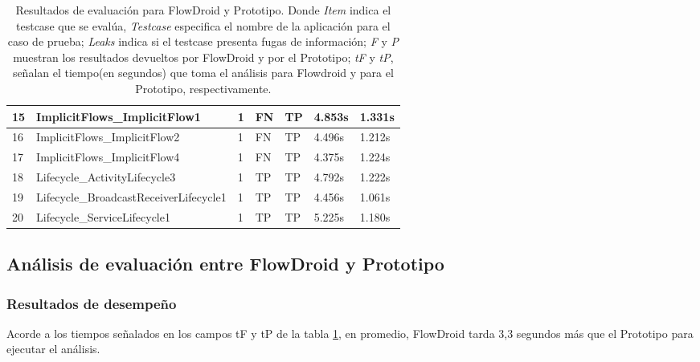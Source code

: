 \begin{table}[H]
\begin{center}
\begin{tabular}{|p{1cm}|p{6cm}|p{1cm}|p{1cm}|p{1cm}|p{1cm}|p{1cm}|}
	\hline
	15 & ImplicitFlows\_ImplicitFlow1 & 1 & FN & TP &4.853s &1.331s\\
	\hline
	16 & ImplicitFlows\_ImplicitFlow2 & 1 & FN & TP &4.496s &1.212s\\
	\hline
	17 & ImplicitFlows\_ImplicitFlow4 & 1 & FN & TP &4.375s &1.224s\\
	\hline
	18 & Lifecycle\_ActivityLifecycle3 & 1 & TP & TP &4.792s &1.222s\\
	\hline
	19 & Lifecycle\_BroadcastReceiverLifecycle1 & 1 & TP & TP &4.456s &1.061s\\
	\hline
	20 & Lifecycle\_ServiceLifecycle1 & 1 & TP & TP &5.225s &1.180s\\
	\hline
\end{tabular}
\end{center}
\caption{Resultados de evaluación para FlowDroid y Prototipo. Donde
\textit{Item} indica el testcase que se evalúa, \textit{Testcase} especifica el
nombre de la aplicación para el caso de prueba; \textit{Leaks} indica si el
testcase presenta fugas de información; \textit{F} y  \textit{P} muestran los
resultados devueltos por FlowDroid y por el Prototipo; \textit{tF} y
\textit{tP}, señalan el tiempo(en segundos) que toma el análisis para Flowdroid
y para el Prototipo, respectivamente.}
\label{tb:resultados}
\end{table}

\subsection{Análisis de evaluación entre FlowDroid y Prototipo}
\subsubsection{Resultados de desempeño}
Acorde a los tiempos señalados en los campos tF y tP de la tabla
\ref{tb:resultados}, en promedio, FlowDroid tarda 3,3 segundos más que el
Prototipo para ejecutar el análisis.

